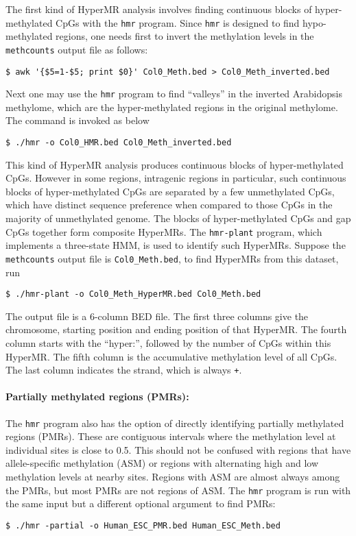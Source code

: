 \documentclass[10pt]{article}
\newcommand{\prog}[1]{\texttt{#1}}
\newcommand{\fn}[1]{\texttt{#1}}
\newcommand{\lit}[1]{\texttt{#1}}
\begin{document}
The first kind of HyperMR analysis involves finding continuous blocks
of hyper-methylated CpGs with the \prog{hmr} program. Since \prog{hmr}
is designed to find hypo-methylated regions, one needs first to invert
the methylation levels in the \prog{methcounts} output file as
follows:
\begin{verbatim}
$ awk '{$5=1-$5; print $0}' Col0_Meth.bed > Col0_Meth_inverted.bed
\end{verbatim}
Next one may use the \prog{hmr} program to find ``valleys'' in the
inverted Arabidopsis methylome, which are the hyper-methylated regions
in the original methylome. The command is invoked as below
\begin{verbatim}
$ ./hmr -o Col0_HMR.bed Col0_Meth_inverted.bed
\end{verbatim}

This kind of HyperMR analysis produces continuous blocks of
hyper-methylated CpGs. However in some regions, intragenic regions in
particular, such continuous blocks of hyper-methylated CpGs are
separated by a few unmethylated CpGs, which have distinct sequence
preference when compared to those CpGs in the majority of unmethylated
genome. The blocks of hyper-methylated CpGs and gap CpGs together form
composite HyperMRs. The \prog{hmr-plant} program, which implements a
three-state HMM, is used to identify such HyperMRs. Suppose the
\prog{methcounts} output file is \fn{Col0\_Meth.bed}, to find HyperMRs
from this dataset, run
\begin{verbatim}
$ ./hmr-plant -o Col0_Meth_HyperMR.bed Col0_Meth.bed
\end{verbatim}
The output file is a 6-column BED file. The first three columns give
the chromosome, starting position and ending position of that
HyperMR. The fourth column starts with the ``hyper:'', followed by the
number of CpGs within this HyperMR. The fifth column is the
accumulative methylation level of all CpGs. The last column indicates
the strand, which is always \lit{+}.

\paragraph{Partially methylated regions (PMRs):}
The \prog{hmr} program also has the option of directly identifying
partially methylated regions (PMRs). These are contiguous intervals
where the methylation level at individual sites is close to 0.5. This
should not be confused with regions that have allele-specific
methylation (ASM) or regions with alternating high and low methylation
levels at nearby sites. Regions with ASM are almost always among the
PMRs, but most PMRs are not regions of ASM. The \prog{hmr} program is
run with the same input but a different optional argument to find
PMRs:
\begin{verbatim}
$ ./hmr -partial -o Human_ESC_PMR.bed Human_ESC_Meth.bed
\end{verbatim}
\end{document}
